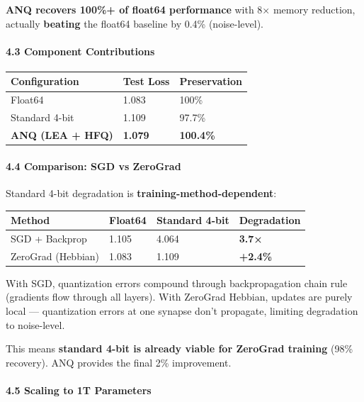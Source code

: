 \documentclass[
  11pt,
  a4paper,
]{article}
\begin{document}
\textbf{ANQ recovers 100\%+ of float64 performance} with 8× memory
reduction, actually \textbf{beating} the float64 baseline by 0.4\%
(noise-level).

\paragraph{4.3 Component Contributions}\label{component-contributions}

\begin{longtable}[]{@{}lll@{}}
\toprule\noalign{}
Configuration & Test Loss & Preservation \\
\midrule\noalign{}
\endhead
\bottomrule\noalign{}
\endlastfoot
Float64 & 1.083 & 100\% \\
Standard 4-bit & 1.109 & 97.7\% \\
\textbf{ANQ (LEA + HFQ)} & \textbf{1.079} & \textbf{100.4\%} \\
\end{longtable}

\paragraph{4.4 Comparison: SGD vs
ZeroGrad}\label{comparison-sgd-vs-zerograd}

Standard 4-bit degradation is \textbf{training-method-dependent}:

\begin{longtable}[]{@{}llll@{}}
\toprule\noalign{}
Method & Float64 & Standard 4-bit & Degradation \\
\midrule\noalign{}
\endhead
\bottomrule\noalign{}
\endlastfoot
SGD + Backprop & 1.105 & 4.064 & \textbf{3.7×} \\
ZeroGrad (Hebbian) & 1.083 & 1.109 & \textbf{+2.4\%} \\
\end{longtable}

With SGD, quantization errors compound through backpropagation chain
rule (gradients flow through all layers). With ZeroGrad Hebbian, updates
are purely local --- quantization errors at one synapse don't propagate,
limiting degradation to noise-level.

This means \textbf{standard 4-bit is already viable for ZeroGrad
training} (98\% recovery). ANQ provides the final 2\% improvement.

\paragraph{4.5 Scaling to 1T Parameters}\label{scaling-to-1t-parameters}
\end{document}

